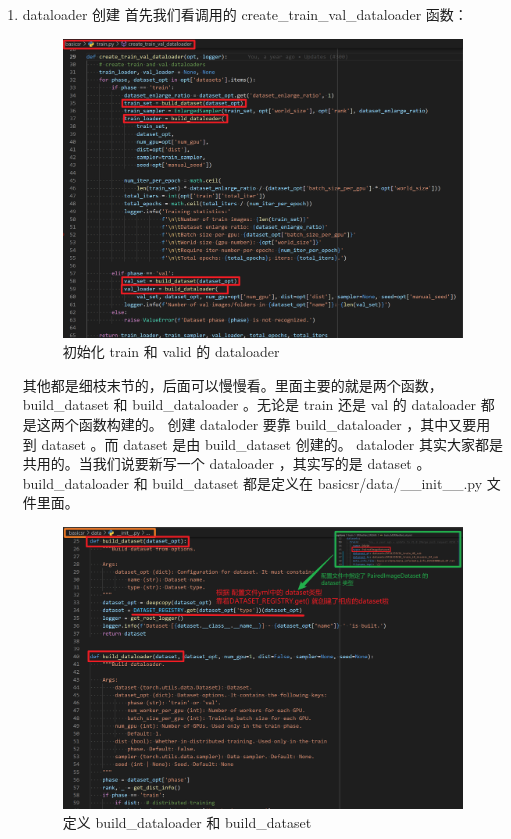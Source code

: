 \documentclass[../main.tex]{subfiles}
\begin{document}
\begin{enumerate}

    \item dataloader 创建
          首先我们看调用的 create\_train\_val\_dataloader 函数：

          \begin{figure}[H]
              \begin{center}
                  \includegraphics[width=0.7\linewidth]{figures/getting_start_9.png}
                  \caption{初始化 train 和 valid 的 dataloader}
                  \label{fig:getting_start_9}
              \end{center}
              \vspace{-0.5cm}
          \end{figure}

          其他都是细枝末节的，后面可以慢慢看。里面主要的就是两个函数， build\_dataset 和 build\_dataloader 。无论是 train 还是 val 的 dataloader 都是这两个函数构建的。
          创建 dataloder 要靠 build\_dataloader ，其中又要用到 dataset 。而 dataset 是由 build\_dataset 创建的。 dataloder 其实大家都是共用的。当我们说要新写一个 dataloader ，其实写的是 dataset 。 build\_dataloader 和 build\_dataset 都是定义在 basicsr/data/\_\_init\_\_.py 文件里面。

          \begin{figure}[H]
              \begin{center}
                  \includegraphics[width=0.7\linewidth]{figures/getting_start_10.png}
                  \caption{定义 build\_dataloader 和 build\_dataset }
                  \label{fig:getting_start_10}
              \end{center}
              \vspace{-0.5cm}
          \end{figure}


\end{enumerate}
\end{document}
